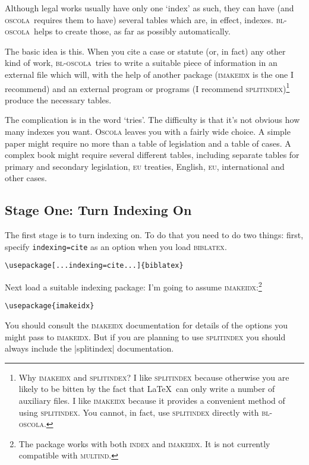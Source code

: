 \documentclass[a5paper,fontsize=9pt,DIV=1]{scrartcl}
\newcommand{\oscola}{\textsc{bl-oscola}}
\newcommand{\biblatex}{\textsc{biblatex}}
\newcommand{\oscolashort}{\textsc{oscola}\nocite{oscola}}
\begin{document}
Although legal works usually have only one `index' as such, they can
have (and \oscolashort\ requires them to have) several
tables which are, in effect, indexes. \oscola\ helps to create those,
as far as possibly automatically.

The basic idea is this. When you cite a case or statute (or, in fact)
any other kind of work, \oscola\ tries to write a suitable piece of
information in an external file which will, with the help of another
package (\textsc{imakeidx} is the one I recommend) and an external
program or programs (I recommend \textsc{splitindex})\footnote{Why
\textsc{imakeidx} and \textsc{splitindex}? I like \textsc{splitindex}
because otherwise you are likely to be bitten by the fact that \LaTeX\
can only write a number of auxiliary files. I like \textsc{imakeidx}
because it provides a convenient method of using
\textsc{splitindex}. You cannot, in fact, use \textsc{splitindex}
directly with \oscola.} produce the necessary tables.

The complication is in the word `tries'. The difficulty is that it's
not obvious how many indexes you want. \textsc{Oscola} leaves you
with a fairly wide choice. A simple paper might require no more than a
table of legislation and a table of cases. A complex book might
require several different tables, including separate tables for
primary and secondary legislation, \textsc{eu} treaties, English,
\textsc{eu}, international and other cases. 

\subsection{Stage One: Turn Indexing On}

The first stage is to turn indexing on. To do that you need to do two
things: first, specify \texttt{indexing=cite} as an option when you
load \biblatex.
\begin{center}
\verb|\usepackage[...indexing=cite...]{biblatex}|
\end{center}

Next load a suitable indexing package: I'm going to assume \textsc{imakeidx}:\footnote{The package works with both \textsc{index} and \textsc{imakeidx}. It is not currently compatible with \textsc{multind}.}
\index[general]{imakeidx!recommended}
\begin{center}
\verb|\usepackage{imakeidx}|
\end{center}
You should consult the \textsc{imakeidx} documentation for details of
the options you might pass to \textsc{imakeidx}. But if you are
planning to use \textsc{splitindex} you should always include the
|splitindex| documentation.
\end{document}
